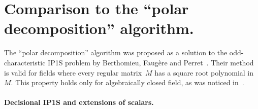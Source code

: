 \documentclass{amsart}
\let\realpar\paragraph
\def\paragraph#1{\realpar{\textbf{#1}}}
\let\fr\mathfrak
\def\mat#1{\begin{pmatrix}#1\end{pmatrix}}
\begin{document}
% 
% 
% 
% 
% 
% 


\section{Comparison to the ``polar decomposition'' algorithm.}
\label{ap:polar}

The “polar decomposition” algorithm was proposed as a solution to
the odd-characteristic IP1S problem by
Berthomieu, Faugère and Perret~\cite{2013bfp}.
Their method is valid for fields where every regular matrix~$M$
has a square root polynomial in~$M$.
This property holds only for algebraically closed field,
as was noticed in~\cite[6.1]{2013bfp}.

\paragraph{Decisional IP1S and extensions of scalars.}
\end{document}
